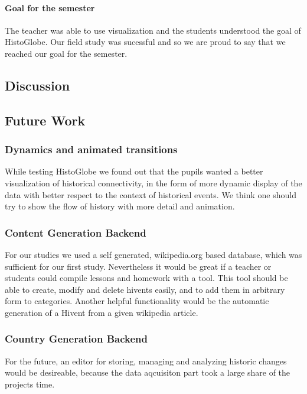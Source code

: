 \paragraph{Goal for the semester} %
The teacher was able to use visualization and the students understood the goal of HistoGlobe. Our field study was sucessful and so we are proud to say that we reached our goal for the semester.

\subsection{Discussion} %
\label{sub:discussion}


\subsection{Future Work} %
\label{sub:future_work}

\subsubsection{Dynamics and animated transitions} %
\label{sub:dynamics_and_animated_transitions}
While testing HistoGlobe we found out that the pupils wanted a better visualization of historical connectivity, in the form of  more dynamic display of the data with better respect to the context of historical events. We think one should try to show the flow of history with more detail and animation.



\subsubsection{Content Generation Backend} %
\label{sub:content_generation_backend}

For our studies we used a self generated, wikipedia.org based database, which was sufficient for our first study. Nevertheless it would be great if a teacher or students could compile lessons and homework with a tool. This tool should be able to create, modify and delete hivents easily, and to add them in arbitrary form to categories.
Another helpful functionality would be the automatic generation of a Hivent from a given wikipedia article.


\subsubsection{Country Generation Backend} %
\label{sub:country_generation_backend}
For the future, an editor for storing, managing and analyzing historic changes would be desireable, because the data aqcuisiton part took a large share of the projects time.

